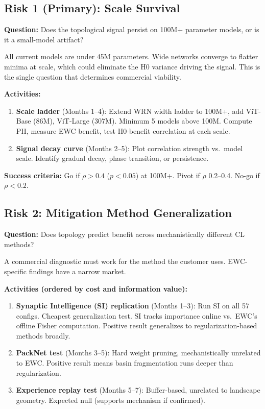 \documentclass[11pt,letterpaper]{article}
\begin{document}
\subsection{Risk 1 (Primary): Scale Survival}

\textbf{Question:} Does the topological signal persist on 100M+ parameter models, or is it a small-model artifact?

All current models are under 45M parameters. Wide networks converge to flatter minima at scale, which could eliminate the H0 variance driving the signal. This is the single question that determines commercial viability.

\textbf{Activities:}
\begin{enumerate}[nosep]
  \item \textbf{Scale ladder} (Months 1--4): Extend WRN width ladder to 100M+, add ViT-Base (86M), ViT-Large (307M). Minimum 5 models above 100M. Compute PH, measure EWC benefit, test H0-benefit correlation at each scale.
  \item \textbf{Signal decay curve} (Months 2--5): Plot correlation strength vs.\ model scale. Identify gradual decay, phase transition, or persistence.
\end{enumerate}

\textbf{Success criteria:} Go if $\rho > 0.4$ ($p < 0.05$) at 100M+. Pivot if $\rho$ 0.2--0.4. No-go if $\rho < 0.2$.

\subsection{Risk 2: Mitigation Method Generalization}

\textbf{Question:} Does topology predict benefit across mechanistically different CL methods?

A commercial diagnostic must work for the method the customer uses. EWC-specific findings have a narrow market.

\textbf{Activities (ordered by cost and information value):}
\begin{enumerate}[nosep]
  \item \textbf{Synaptic Intelligence (SI) replication} (Months 1--3): Run SI on all 57 configs. Cheapest generalization test. SI tracks importance online vs.\ EWC's offline Fisher computation. Positive result generalizes to regularization-based methods broadly.
  \item \textbf{PackNet test} (Months 3--5): Hard weight pruning, mechanistically unrelated to EWC. Positive result means basin fragmentation runs deeper than regularization.
  \item \textbf{Experience replay test} (Months 5--7): Buffer-based, unrelated to landscape geometry. Expected null (supports mechanism if confirmed).
\end{enumerate}
\end{document}
